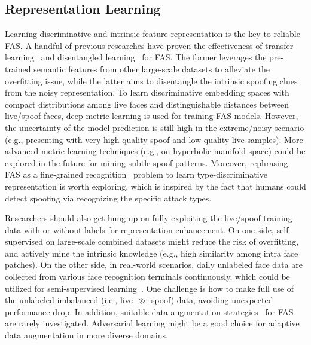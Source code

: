 \documentclass[10pt,journal,compsoc]{IEEEtran}
\begin{document}
\vspace{-0.3em}
\subsection{Representation Learning}
Learning discriminative and intrinsic feature representation is the key to reliable FAS. A handful of previous researches have proven the effectiveness of transfer learning~\cite{lucena2017transfer,parkin2019recognizing} and disentangled learning~\cite{zhang2020face,liu2020physics} for FAS. The former leverages the pre-trained semantic features from other large-scale datasets to alleviate the overfitting issue, while the latter aims to disentangle the intrinsic spoofing clues from the noisy representation. To learn discriminative embedding spaces with compact distributions among live faces and distinguishable distances between live/spoof faces, deep metric learning is used for training FAS models. However, the uncertainty of the model prediction is still high in the extreme/noisy scenario (e.g., presenting with very high-quality spoof and low-quality live samples). More advanced metric learning techniques (e.g., on hyperbolic manifold space) could be explored in the future for mining subtle spoof patterns. Moreover, rephrasing FAS as a fine-grained recognition~\cite{yu2020face,wang2022patchnet} problem to learn type-discriminative representation is worth exploring, which is inspired by the fact that humans could detect spoofing via recognizing the specific attack types.  

Researchers should also get hung up on fully exploiting the live/spoof training data with or without labels for representation enhancement. On one side, self-supervised on large-scale combined datasets might reduce the risk of overfitting, and actively mine the intrinsic knowledge (e.g., high similarity among intra face patches). On the other side, in real-world scenarios, daily unlabeled face data are collected from various face recognition terminals continuously, which could be utilized for semi-supervised learning~\cite{quan2021progressive}. One challenge is how to make full use of the unlabeled imbalanced (i.e., live $\gg$ spoof) data, avoiding unexpected performance drop. In addition, suitable data augmentation strategies~\cite{yu2021dual} for FAS are rarely investigated. Adversarial learning might be a good choice for adaptive data augmentation in more diverse domains.        
\end{document}
